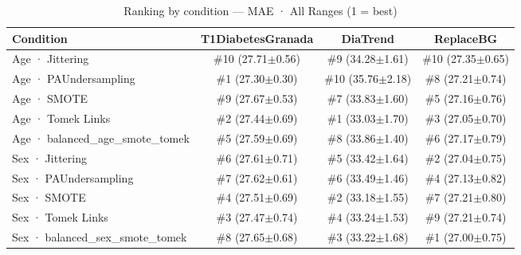 \begin{table}[htbp]
\centering
\small
\caption{Ranking by condition — MAE · All Ranges  (1 = best)}
\label{tab:ranking_mae_entire_family_mechanism_guided}
\begin{tabular}{lccc}
\toprule
\textbf{Condition} & \textbf{T1DiabetesGranada} & \textbf{DiaTrend} & \textbf{ReplaceBG} \\
\midrule
Age · Jittering & \#10 (27.71$\pm$0.56) & \#9 (34.28$\pm$1.61) & \#10 (27.35$\pm$0.65) \\
Age · PAUndersampling & \#1 (27.30$\pm$0.30) & \#10 (35.76$\pm$2.18) & \#8 (27.21$\pm$0.74) \\
Age · SMOTE & \#9 (27.67$\pm$0.53) & \#7 (33.83$\pm$1.60) & \#5 (27.16$\pm$0.76) \\
Age · Tomek Links & \#2 (27.44$\pm$0.69) & \#1 (33.03$\pm$1.70) & \#3 (27.05$\pm$0.70) \\
Age · balanced_age_smote_tomek & \#5 (27.59$\pm$0.69) & \#8 (33.86$\pm$1.40) & \#6 (27.17$\pm$0.79) \\
\midrule
Sex · Jittering & \#6 (27.61$\pm$0.71) & \#5 (33.42$\pm$1.64) & \#2 (27.04$\pm$0.75) \\
Sex · PAUndersampling & \#7 (27.62$\pm$0.61) & \#6 (33.49$\pm$1.46) & \#4 (27.13$\pm$0.82) \\
Sex · SMOTE & \#4 (27.51$\pm$0.69) & \#2 (33.18$\pm$1.55) & \#7 (27.21$\pm$0.80) \\
Sex · Tomek Links & \#3 (27.47$\pm$0.74) & \#4 (33.24$\pm$1.53) & \#9 (27.21$\pm$0.74) \\
Sex · balanced_sex_smote_tomek & \#8 (27.65$\pm$0.68) & \#3 (33.22$\pm$1.68) & \#1 (27.00$\pm$0.75) \\
\bottomrule
\end{tabular}
\end{table}